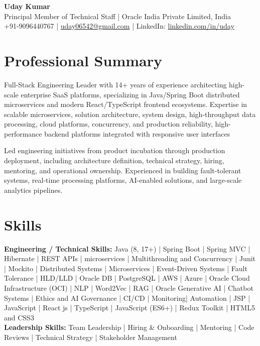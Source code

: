 \documentclass[11pt,a4paper]{article}
\begin{document}
\begin{center}
    {\LARGE \textbf{Uday Kumar}} \\[4pt]
    
    Principal Member of Technical Staff \; | \; Oracle India Private Limited, India \\[4pt]
    
    +91-9096440767 \; | \;
    \href{mailto:uday06542@gmail.com}{uday06542@gmail.com}
    \; | \;
    LinkedIn:
    \href{https://www.linkedin.com/in/uday/}{linkedin.com/in/uday}
\end{center}

\section*{Professional Summary}

Full-Stack Engineering Leader with 14+ years of experience architecting high-scale enterprise SaaS platforms, specializing in Java/Spring Boot distributed microservices and modern React/TypeScript frontend ecosystems. Expertise in scalable microservices, solution architecture, system design, high-throughput data processing, cloud platforms, concurrency, and production reliability, high-performance backend platforms integrated with responsive user interfaces

Led engineering initiatives from product incubation through production deployment, including architecture definition, technical strategy, hiring, mentoring, and operational ownership. Experienced in building fault-tolerant systems, real-time processing platforms, AI-enabled solutions, and large-scale analytics pipelines.

\section*{Skills}

\textbf{Engineering / Technical Skills:} Java (8, 17+) | Spring Boot | Spring MVC | Hibernate | REST APIs
| microservices | Multithreading and Concurrency | Junit | Mockito | Distributed Systems | Microservices
| Event-Driven Systems | Fault Tolerance | HLD/LLD | Oracle DB | PostgreSQL | AWS | Azure | Oracle
Cloud Infrastructure (OCI) | NLP | Word2Vec | RAG | Oracle Generative AI | Chatbot Systems | Ethics
and AI Governance | CI/CD | Monitoring| Automation | JSP | JavaScript | React js | TypeScript |
JavaScript (ES6+) | Redux Toolkit | HTML5 and CSS3\\
\textbf{Leadership Skills:} Team Leadership | Hiring \& Onboarding | Mentoring | Code Reviews | Technical Strategy | Stakeholder Management \\
\end{document}
